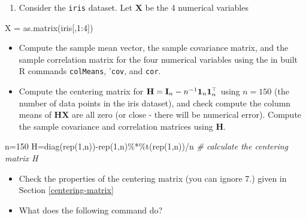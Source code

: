 \documentclass[
]{book}
\newenvironment{Shaded}{\begin{snugshade}}{\end{snugshade}}
\newcommand{\CommentTok}[1]{\textcolor[rgb]{0.56,0.35,0.01}{\textit{#1}}}
\newcommand{\DecValTok}[1]{\textcolor[rgb]{0.00,0.00,0.81}{#1}}
\newcommand{\FunctionTok}[1]{\textcolor[rgb]{0.00,0.00,0.00}{#1}}
\newcommand{\NormalTok}[1]{#1}
\newcommand{\OtherTok}[1]{\textcolor[rgb]{0.56,0.35,0.01}{#1}}
\newcommand{\SpecialCharTok}[1]{\textcolor[rgb]{0.00,0.00,0.00}{#1}}
\providecommand{\tightlist}{%
  \setlength{\itemsep}{0pt}\setlength{\parskip}{0pt}}
\theoremstyle{definition}
\theoremstyle{definition}
\theoremstyle{definition}
\theoremstyle{definition}
\theoremstyle{remark}
\begin{document}
\begin{enumerate}
\def\labelenumi{\arabic{enumi}.}
\setcounter{enumi}{1}
\tightlist
\item
  Consider the \texttt{iris} dataset. Let \(\mathbf X\) be the 4 numerical variables
\end{enumerate}

\begin{Shaded}
\begin{Highlighting}[]
\NormalTok{X }\OtherTok{=} \FunctionTok{as.matrix}\NormalTok{(iris[,}\DecValTok{1}\SpecialCharTok{:}\DecValTok{4}\NormalTok{])}
\end{Highlighting}
\end{Shaded}

\begin{itemize}
\item
  Compute the sample mean vector, the sample covariance matrix, and the sample correlation matrix for the four numerical variables using the in built R commands \texttt{colMeans}, '\texttt{cov}, and \texttt{cor}.
\item
  Compute the centering matrix for
  \({\bf H}={\bf I}_n-n^{-1}{\bf 1}_n {\bf 1}_n^\top\)
  using \(n=150\) (the number of data points in the iris dataset), and check compute the column means of \(\mathbf H\mathbf X\) are all zero (or close - there will be numerical error). Compute the sample covariance and correlation matrices using \(\mathbf H\).
\end{itemize}

\begin{Shaded}
\begin{Highlighting}[]
\NormalTok{n}\OtherTok{=}\DecValTok{150}
\NormalTok{H}\OtherTok{=}\FunctionTok{diag}\NormalTok{(}\FunctionTok{rep}\NormalTok{(}\DecValTok{1}\NormalTok{,n))}\SpecialCharTok{{-}}\FunctionTok{rep}\NormalTok{(}\DecValTok{1}\NormalTok{,n)}\SpecialCharTok{\%*\%}\FunctionTok{t}\NormalTok{(}\FunctionTok{rep}\NormalTok{(}\DecValTok{1}\NormalTok{,n))}\SpecialCharTok{/}\NormalTok{n   }\CommentTok{\# calculate the centering matrix H}
\end{Highlighting}
\end{Shaded}

\begin{itemize}
\item
  Check the properties of the centering matrix (you can ignore 7.) given in Section \ref{centering-matrix}
\item
  What does the following command do?
\end{itemize}
\end{document}
